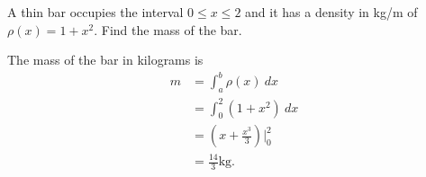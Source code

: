 \begin{example} \label{eg:6.4.1} %
A thin bar occupies the interval $0 \leq x \leq 2$ and it has a density in kg/m of $\rho(x) = 1+ x^2$. Find the mass of the bar. 

\solution
The mass of the bar in kilograms is 
\begin{align*}
	m &=	\int_a^b \rho(x) \ dx \\
		&=	\int_0^2 (1+x^2) \ dx \\
		&= 	\left(x+\frac{x^3}{3} \right) \Big|_0^2 \\
		&= \frac{14}{3} \text{kg}.
\end{align*}

\end{example}


